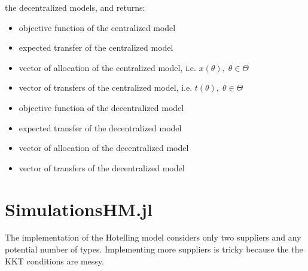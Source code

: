 \documentclass[11pt, oneside]{article}
\begin{document}
\begin{itemize}
  the decentralized models, and returns:
  \begin{itemize}
    \item objective function of the centralized model
    \item expected transfer of the centralized model
    \item vector of allocation of the centralized model, i.e. \(x(\theta), \; \theta \in \Theta\)
    \item vector of transfers of the centralized model, i.e. \(t(\theta), \; \theta \in \Theta\)
    \item objective function of the decentralized model
    \item expected transfer of the decentralized model
    \item vector of allocation of the decentralized model
    \item vector of transfers of the decentralized model
  \end{itemize}
\end{itemize}

\section{SimulationsHM.jl}
The implementation of the Hotelling model considers only two suppliers and any potential
number of types. Implementing more suppliers is tricky because the the KKT
conditions are messy.
\end{document}
